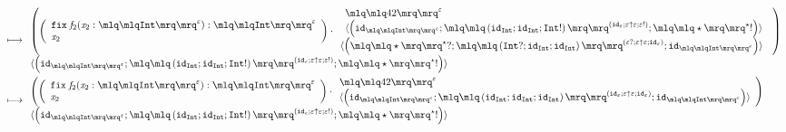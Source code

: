 \documentclass{article}
\begin{document}
\begin{align*}
\longmapsto &\;\begin{array}{l}\left(\left(\begin{array}{l} \mathtt{fix}\; \mathit{f}_{2}(\mathit{x}_{2}:\quot{\mathtt{Int}}^{\varepsilon}): \quot{\mathtt{Int}}^{\varepsilon}\\\mathit{x}_{2}\end{array}\right)\cdot \begin{array}{l}\begin{array}{l}\quot{42}^{\varepsilon}\\\langle\left(\mathtt{id}_{\quot{\mathtt{Int}}^{\varepsilon}};\quot{\left(\mathtt{id}_{\mathtt{Int}};\mathtt{id}_{\mathtt{Int}};\mathtt{Int}!\right)}^{\left(\mathtt{id}_{\varepsilon};\varepsilon \uparrow \varepsilon;\varepsilon!\right)};\quot{\star}^{\star}!\right)\rangle\end{array}\\\langle\left(\quot{\star}^{\star}?;\quot{\left(\mathtt{Int}?;\mathtt{id}_{\mathtt{Int}};\mathtt{id}_{\mathtt{Int}}\right)}^{\left(\varepsilon?;\varepsilon \uparrow \varepsilon;\mathtt{id}_{\varepsilon}\right)};\mathtt{id}_{\quot{\mathtt{Int}}^{\varepsilon}}\right)\rangle\end{array}\right)\\\langle\left(\mathtt{id}_{\quot{\mathtt{Int}}^{\varepsilon}};\quot{\left(\mathtt{id}_{\mathtt{Int}};\mathtt{id}_{\mathtt{Int}};\mathtt{Int}!\right)}^{\left(\mathtt{id}_{\varepsilon};\varepsilon \uparrow \varepsilon;\varepsilon!\right)};\quot{\star}^{\star}!\right)\rangle\end{array}\\ 
\longmapsto &\;\begin{array}{l}\left(\left(\begin{array}{l} \mathtt{fix}\; \mathit{f}_{2}(\mathit{x}_{2}:\quot{\mathtt{Int}}^{\varepsilon}): \quot{\mathtt{Int}}^{\varepsilon}\\\mathit{x}_{2}\end{array}\right)\cdot \begin{array}{l}\quot{42}^{\varepsilon}\\\langle\left(\mathtt{id}_{\quot{\mathtt{Int}}^{\varepsilon}};\quot{\left(\mathtt{id}_{\mathtt{Int}};\mathtt{id}_{\mathtt{Int}};\mathtt{id}_{\mathtt{Int}}\right)}^{\left(\mathtt{id}_{\varepsilon};\varepsilon \uparrow \varepsilon;\mathtt{id}_{\varepsilon}\right)};\mathtt{id}_{\quot{\mathtt{Int}}^{\varepsilon}}\right)\rangle\end{array}\right)\\\langle\left(\mathtt{id}_{\quot{\mathtt{Int}}^{\varepsilon}};\quot{\left(\mathtt{id}_{\mathtt{Int}};\mathtt{id}_{\mathtt{Int}};\mathtt{Int}!\right)}^{\left(\mathtt{id}_{\varepsilon};\varepsilon \uparrow \varepsilon;\varepsilon!\right)};\quot{\star}^{\star}!\right)\rangle\end{array}\\ 

\end{align*}
\end{document}
